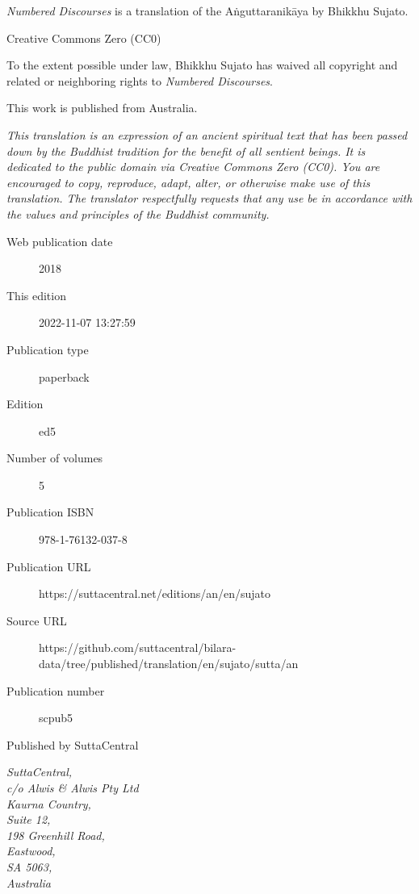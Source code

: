 \documentclass[12pt,openany]{book}%
\begin{document}
\begin{footnotesize}

\textit{Numbered Discourses} is a translation of the Aṅguttaranikāya by Bhikkhu Sujato.

\medskip

Creative Commons Zero (CC0)

To the extent possible under law, Bhikkhu Sujato has waived all copyright and related or neighboring rights to \textit{Numbered Discourses}.

\medskip

This work is published from Australia.

\begin{center}
\textit{This translation is an expression of an ancient spiritual text that has been passed down by the Buddhist tradition for the benefit of all sentient beings. It is dedicated to the public domain via Creative Commons Zero (CC0). You are encouraged to copy, reproduce, adapt, alter, or otherwise make use of this translation. The translator respectfully requests that any use be in accordance with the values and principles of the Buddhist community.}
\end{center}

\medskip

\begin{description}
    \item[Web publication date] 2018
    \item[This edition] 2022-11-07 13:27:59
    \item[Publication type] paperback
    \item[Edition] ed5
    \item[Number of volumes] 5
    \item[Publication ISBN] 978-1-76132-037-8
    \item[Publication URL] https://suttacentral.net/editions/an/en/sujato
    \item[Source URL] https://github.com/suttacentral/bilara-data/tree/published/translation/en/sujato/sutta/an
    \item[Publication number] scpub5
\end{description}

\medskip

Published by SuttaCentral

\medskip

\textit{SuttaCentral,\\
c/o Alwis \& Alwis Pty Ltd\\
Kaurna Country,\\
Suite 12,\\
198 Greenhill Road,\\
Eastwood,\\
SA 5063,\\
Australia}

\end{footnotesize}
\end{document}
